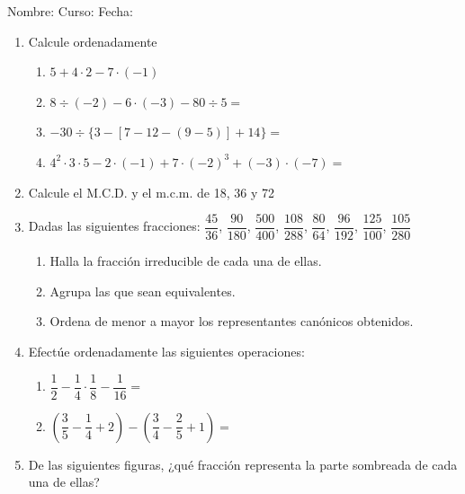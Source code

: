 \documentclass[fleqn]{article}
\newcommand{\LineaNombre}{%
\par
\vspace{\baselineskip}
Nombre:\hrulefill \; Curso: \underline{\hspace*{48pt}} \; Fecha: \underline{\hspace*{2.5cm}} \relax
\par}
\begin{document}
\LineaNombre
\begin{enumerate}
 \item Calcule ordenadamente
 \begin{enumerate}
 \item $5+4\cdot 2-7\cdot (-1)$\noanswer[.2in]
 \item $8\div (-2)-6\cdot (-3)-80\div 5 =$\noanswer[.2in]
   \item $-30\div \{3-[7-12-(9-5)]+14\}=$\noanswer[.2in]
 \item $4^{2}\cdot 3\cdot 5-2\cdot (-1)+7\cdot (-2)^{3}+(-3)\cdot (-7)=$\noanswer[.2in]
 \end{enumerate}
 \item Calcule el M.C.D. y el m.c.m. de 18, 36 y 72 \noanswer[.75in]
 \item Dadas las siguientes fracciones: $\dfrac{45}{36}$, $\dfrac{90}{180}$, $\dfrac{500}{400}$, $\dfrac{108}{288}$, $\dfrac{80}{64}$, $\dfrac{96}{192}$, $\dfrac{125}{100}$, $\dfrac{105}{280}$
 \begin{enumerate}
 \item Halla la fracción irreducible de cada una de ellas.
 \item Agrupa las que sean equivalentes.
 \item Ordena de menor a mayor los representantes canónicos obtenidos.
 \end{enumerate}
 \noanswer
  \newpage
 \item Efectúe ordenadamente las siguientes operaciones:
 \begin{enumerate}
 \item $\dfrac{1}{2}-\dfrac{1}{4}\cdot \dfrac{1}{8}-\dfrac{1}{16}=$\noanswer[.5in]
 \item $\left(\dfrac{3}{5}-\dfrac{1}{4}+2\right)-\left(\dfrac{3}{4}-\dfrac{2}{5}+1\right)=$\noanswer[.5in]
 \end{enumerate}
 \item De las siguientes figuras, ¿qué fracción representa la parte sombreada de cada una de ellas?
 \begin{enumerate}
\end{enumerate}
\end{enumerate}
\end{document}
